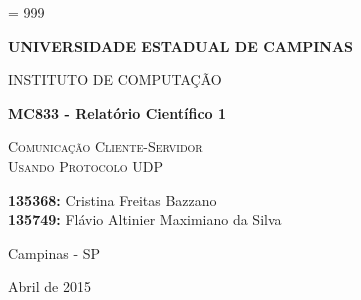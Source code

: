 \documentclass[12pt,a4paper]{article}
\begin{document}
\tolerance = 999
\sloppy


\thispagestyle{empty}

\begin{center}{\large \bf UNIVERSIDADE ESTADUAL DE CAMPINAS} \end{center}
\begin{center}{\large INSTITUTO DE COMPUTAÇÃO} \end{center}

\begin{center}
\begin{minipage}[tl]{31mm}
\end{minipage}
\end{center}

\vspace*{3.5cm}

\begin{center}
{\Large \bf MC833 - Relatório Científico 1}

\vspace*{2.0cm}

\textsc{\Large Comunicação Cliente-Servidor} \\ [0.1cm]
\textsc{\Large Usando Protocolo UDP}

\vspace{2.5cm}

\textbf{135368:} Cristina Freitas Bazzano \\
\textbf{135749:} Flávio Altinier Maximiano da Silva

\vspace{7.5cm}

{\large Campinas - SP}
\vspace*{0.2cm}

{\large Abril de 2015}
\end{center}

\clearpage

\onehalfspacing
\tableofcontents 
\clearpage
\onehalfspacing

\begin{abstract}
Este trabalho focou-se no estudo temporal de redes cliente-servidor baseadas em comunicação UDP e um comparativo com um estudo anterior baseado em comunicação TCP. Foi implementado um serviço de locadora de filmes baseado em {\it MySQL} no servidor, e ao cliente foram adicionadas diversas operações de acesso ao banco, baseando-se em operações de consultas pequenas, grandes e de escrita. Observou-se que a escrita no banco é o processo mais lento, enquanto operações de consultas extensas são apenas brevemente mais lentas que buscas mais curtas, o que também ocorreu com o TCP. Outro ponto interessante medido foi a confiabilidade das transmissões, em ambos os protocolos nenhuma mensagem foi perdida. Notamos também que o tempo total de comunicação no protocolo UDP foi cerca de 10 vezes menor que o TCP. Além disso, uma breve análise de tamanho de código mostrou que operações de redes não são as mais presentes em uma implementação desse tipo.
\end{abstract}
\end{document}
